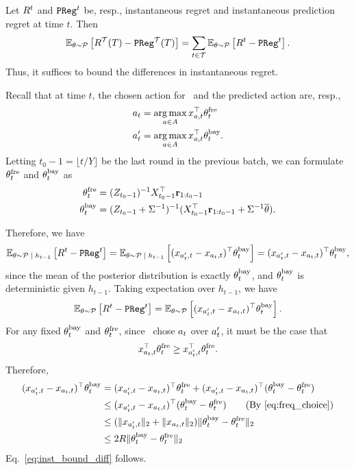 Let $R^{t}$ and $\mathtt{PReg}^{t}$ be, resp., instantaneous regret and instantaneous prediction regret at time $t$. Then
  \begin{equation}
    \operatorname{\mathbb{E}}_{\theta \sim \mathcal{P}}\left[R^{{\mathcal{T}}}(T) - \mathtt{PReg}^{{\mathcal{T}}}(T)\right]
    = \sum_{t\in \mathcal{T}} \operatorname{\mathbb{E}}_{\theta \sim
    \mathcal{P}} \left[R^{t} - \mathtt{PReg}^{t}\right].
    \label{eq:reg_time}
  \end{equation}
  Thus, it suffices to bound the differences in instantaneous regret.

  Recall that at time $t$, the chosen action for \fg\ and the predicted action are, resp.,
  \begin{align*}
    a_t &= \operatorname*{arg\,max}_{a \in A} x_{a,t}^{\top} \theta_{t}^{\textrm{fre}} \\
    a_t' &= \operatorname*{arg\,max}_{a \in A} x_{a,t}^{\top} \theta_t^{\textrm{bay}}.
  \end{align*}
Letting $t_0 - 1 = \lfloor t/Y \rfloor$ be the last round in the previous batch,
we can formulate $\theta_{t}^{\textrm{fre}}$ and $\theta_t^{\textrm{bay}}$ as 
\begin{align*}
    \theta_{t}^{\textrm{fre}} &= (Z_{t_0-1})^{-1} X_{t_0-1}^{\top} \mathbf{r}_{1:t_0-1} \\
    \theta_t^{\textrm{bay}} &= (Z_{t_0-1} + \Sigma^{-1})^{-1} (X_{t_0-1}^{\top} \mathbf{r}_{1:t_0-1} + \Sigma^{-1} \overline \theta).
\end{align*}

  Therefore, we have
  \[
    \operatorname{\mathbb{E}}_{\theta \sim \mathcal{P} \;|\; h_{t-1}}\left[R^{t} - \mathtt{PReg}^{t}\right] = \operatorname{\mathbb{E}}_{\theta \sim
      \mathcal{P} \;|\; h_{t-1}} \left[(x_{a_t',t} - x_{a_t,t})^{\top} \theta_t^{\textrm{bay}}\right] =
      (x_{a_t',t} - x_{a_t,t})^{\top} \theta_t^{\textrm{bay}},
  \]
  since the mean of the posterior distribution is exactly $\theta_t^{\textrm{bay}}$, and $\theta_t^{\textrm{bay}}$ is
  deterministic given $h_{t-1}$. Taking expectation over $h_{t-1}$, we have
  \[
    \operatorname{\mathbb{E}}_{\theta \sim \mathcal{P}}\left[R^{t} - \mathtt{PReg}^{t}\right] = \operatorname{\mathbb{E}}_{\theta \sim \mathcal{P}}
    \left[(x_{a_t',t} - x_{a_t,t})^{\top} \theta_t^{\textrm{bay}}\right].
  \]
  For any fixed $\theta_t^{\textrm{bay}}$ and $\theta_{t}^{\textrm{fre}}$, since \fg\ chose $a_t$ over $a_t'$, it must be
  the case that
  \begin{equation}
    x_{a_t,t}^{\top} \theta_{t}^{\textrm{fre}} \ge x_{a_t',t}^{\top} \theta_{t}^{\textrm{fre}}.
    \label{eq:freq_choice}
  \end{equation}
  Therefore,
  \begin{align*}
    (x_{\ab,t} - x_{\af,t})\tran \bmt &= (x_{\ab,t} - x_{\af,t})\tran \fmt +
    (x_{\ab,t} - x_{\af,t})\tran (\bmt - \fmt) \\
    &\le (x_{\ab,t} - x_{\af,t})\tran (\bmt - \fmt)
    \tag{By~\eqref{eq:freq_choice}} \\
    &\le (\|x_{\ab,t}\|_2 + \|x_{\af,t}\|_2)\|\bmt - \fmt\|_2 \\
    &\le 2R\|\bmt - \fmt\|_2
  \end{align*}
Eq.~\eqref{eq:inst_bound_diff} follows.

